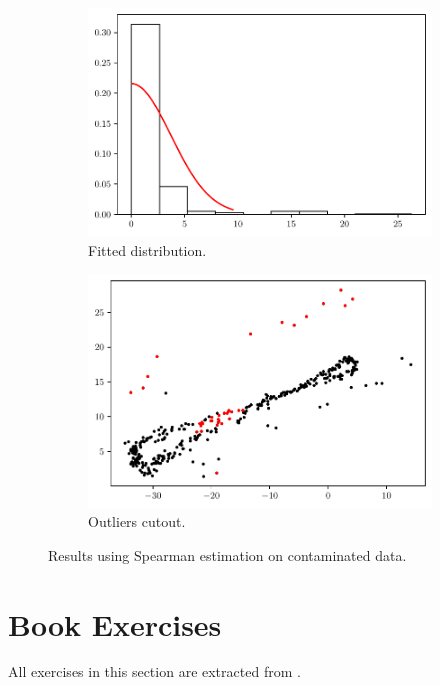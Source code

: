 \documentclass[11pt]{article}
\theoremstyle{definition}
\theoremstyle{remark}
\theoremstyle{remark}
\begin{document}
\begin{figure}[H]
  \centering
  \begin{subfigure}[t]{0.475\textwidth}
    \centering
    \includegraphics[scale=0.45]{../figs/spearman_hist_with-noise.pdf}
    \caption{Fitted distribution.}
  \end{subfigure}
  \begin{subfigure}[t]{0.475\textwidth}
    \centering
    \includegraphics[scale=0.45]{../figs/spearman_scatter_with-noise.pdf}
    \caption{Outliers cutout.}
  \end{subfigure}
  \caption{Results using Spearman estimation on contaminated data.}
  \label{fig:spearman_cut_wnoise}
\end{figure}


\section{Book Exercises}
All exercises in this section are extracted from \parencite{wasserman2006}.
\end{document}
